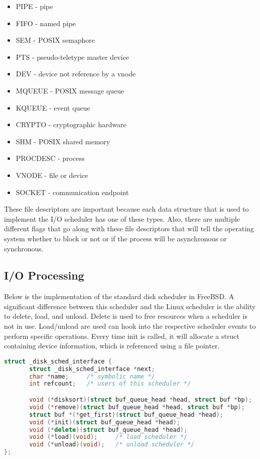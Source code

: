 \documentclass[letterpaper,draftclsnofoot,10pt,onecolumn,titlepage]{IEEEtran}\usepackage[margin=0.75in]{geometry}
\begin{document}
\begin{itemize}
\item  PIPE - pipe
\item  FIFO - named pipe
\item  SEM - POSIX semaphore
\item  PTS - pseudo-teletype master device
\item  DEV - device not reference by a vnode
\item  MQUEUE - POSIX message queue
\item  KQUEUE - event queue
\item  CRYPTO - cryptographic hardware
\item  SHM - POSIX shared memory
\item  PROCDESC - process
\item  VNODE - file or device
\item  SOCKET - communication endpoint
\end{itemize}\cite{FreeBSD2} 

These file descriptors are important because each data structure that is used to implement the 
I/O scheduler has one of these types. Also, there are multiple different flags that go along 
with these file descriptors that will tell the operating system whether to block or not or if 
the process will be asynchronous or synchronous. 

\subsection{I/O Processing}
Below is the implementation of the standard disk scheduler in FreeBSD. A significant difference between 
this scheduler and the Linux scheduler is the ability to delete, load, and unload. Delete is used to free
resources when a scheduler is not in use. Load/unload are used can hook into the respective scheduler events
to perform specific operations. Every time init is called, it will allocate a struct containing device 
information, which is referenced using a file pointer.

\begin{lstlisting}[language=C++]
struct _disk_sched_interface {
       struct _disk_sched_interface *next;
       char *name;     /* symbolic name */
       int refcount;   /* users of this scheduler */

       void (*disksort)(struct buf_queue_head *head, struct buf *bp);
       void (*remove)(struct buf_queue_head *head, struct buf *bp);
       struct buf *(*get_first)(struct buf_queue_head *head);
       void (*init)(struct buf_queue_head *head);
       void (*delete)(struct buf_queue_head *head);
       void (*load)(void);     /* load scheduler */
       void (*unload)(void);   /* unload scheduler */
};
\end{lstlisting}
\end{document}
